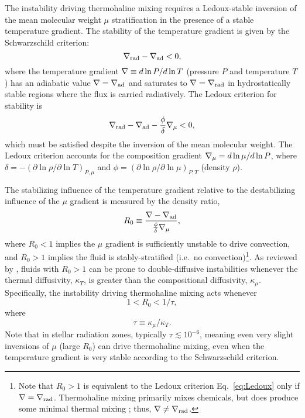 %
%
The instability driving thermohaline mixing requires a Ledoux-stable inversion of the mean molecular weight $\mu$ stratification in the presence of a stable temperature gradient. 
The stability of the temperature gradient is given by the Schwarzschild criterion:
\begin{equation} \label{eq:Schwarzschild}
    \gradrad - \gradad < 0,
\end{equation}
where the temperature gradient $\nabla \equiv d \ln P / d \ln T$ (pressure $P$ and temperature $T$) has an adiabatic value $\nabla = \nabla_{\rm{ad}}$ and saturates to $\nabla = \nabla_{\rm{rad}}$ in hydrostatically stable regions where the flux is carried radiatively. 
The Ledoux criterion for stability is \citep{Ledoux1947}
\begin{equation} \label{eq:Ledoux}
    \gradrad - \gradad - \frac{\phi}{\delta}\gradmu < 0,
\end{equation}
which must be satisfied despite the inversion of the mean molecular weight.
The Ledoux criterion accounts for the composition gradient $\nabla_{\mu} = d\ln\mu/d\ln P$, where $\delta = -(\partial \ln \rho / \partial \ln T)_{P,\mu}$ and $\phi = (\partial \ln \rho / \partial \ln\mu)_{P,T}$ (density $\rho$).

The stabilizing influence of the temperature gradient relative to the destabilizing influence of the $\mu$ gradient is measured by the density ratio,
\begin{equation} \label{eq:R0}
    R_0 \equiv \frac{\grad - \gradad}{\frac{\phi}{\delta} \gradmu},
\end{equation}
where $R_0 < 1$ implies the $\mu$ gradient is sufficiently unstable to drive convection, and $R_0 > 1$ implies the fluid is stably-stratified (i.e.~no convection)\footnote{Note that $R_0>1$ is equivalent to the Ledoux criterion Eq.~\eqref{eq:Ledoux} only if $\nabla = \nabla_{\rm{rad}}$. Thermohaline mixing primarily mixes chemicals, but does produce some minimal thermal mixing \citep[see, e.g., Fig.~4 of][]{brown_etal_2013}; thus, $\nabla \neq \nabla_{\rm{rad}}$.}. 
As reviewed by \citet{garaud_DDC_review_2018}, fluids with $R_0 > 1$ can be prone to double-diffusive instabilities whenever the thermal diffusivity, $\kappa_T$, is greater than the compositional diffusivity, $\kappa_\mu$. Specifically, the instability driving thermohaline mixing acts whenever
\begin{equation} \label{eq:R0_condition}
1 < R_0 < 1/\tau,
\end{equation}
\citep{baines_gill_1969} where
\begin{equation} \label{eq:tau}
    \tau \equiv \kappa_\mu/\kappa_T.
\end{equation}
Note that in stellar radiation zones, typically $\tau \lesssim 10^{-6}$, meaning even very slight inversions of $\mu$ (large $R_0$) can drive thermohaline mixing, even when the temperature gradient is very stable according to the Schwarzschild criterion.

